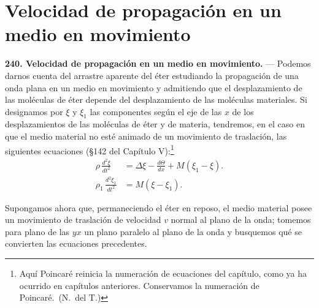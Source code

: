 \section{Velocidad de propagación en un medio en movimiento}

\noindent\textbf{240. Velocidad de propagación en un medio en movimiento.}
— Podemos darnos cuenta del arrastre aparente del éter estudiando la
propagación de una onda plana en un medio en movimiento y admitiendo que el
desplazamiento de las moléculas de éter depende del desplazamiento de las
moléculas materiales. Si designamos por $\xi$ y $\xi_1$ las componentes
según el eje de las $x$ de los desplazamientos de las moléculas de éter y
de materia, tendremos, en el caso en que el medio material no esté animado
de un movimiento de traslación, las siguientes ecuaciones (\S 142 del
Capítulo V):\footnote{Aquí Poincaré reinicia la numeración de ecuaciones
del capítulo, como ya ha ocurrido en capítulos anteriores. Conservamos la
numeración de Poincaré.~(N.~del T.)}
\setcounter{equation}{0}
\begin{align}
\rho\,\frac{d^2\xi}{dt^2} &= \Delta\xi - \frac{d\Theta}{dx} + M(\xi_1-\xi). \\
\rho_1\,\frac{d^2\xi_1}{dt^2} &= M(\xi-\xi_1).
\end{align}

Supongamos ahora que, permaneciendo el éter en reposo, el medio material
posee un movimiento de traslación de velocidad $v$ normal al plano de la
onda; tomemos para plano de las $yx$ un plano paralelo al plano de la onda
y busquemos qué se convierten las ecuaciones precedentes.

